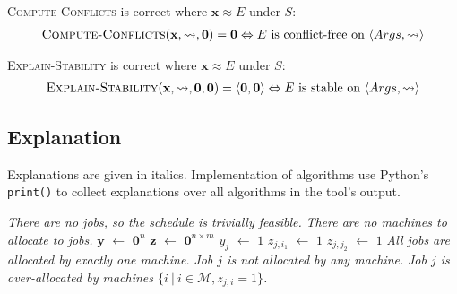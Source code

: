 \begin{proposition}
	\textsc{Compute-Conflicts} is correct where $\mathbf{x}\approx E$ under $S$:
	\begin{align*}
	\textsc{Compute-Conflicts}(\mathbf{x},\rightsquigarrow,\mathbf{0})=\mathbf{0}\Leftrightarrow E\text{ is conflict-free on }\langle Args, \rightsquigarrow\rangle
	\end{align*}
\end{proposition}

\begin{proposition}
	\textsc{Explain-Stability} is correct where $\mathbf{x}\approx E$ under $S$:
	\begin{align*}
		\textsc{Explain-Stability}(\mathbf{x},\rightsquigarrow,\mathbf{0},\mathbf{0})=\langle{\mathbf{0}},{\mathbf{0}}\rangle\Leftrightarrow E\text{ is stable on }\langle Args, \rightsquigarrow\rangle
	\end{align*}
\end{proposition}
	
\subsection{Explanation}

Explanations are given in italics. Implementation of algorithms use Python's \verb|print()| to collect explanations over all algorithms in the tool's output.

\begin{algorithm}[H]
	\caption{}
	\begin{algorithmic}[1]
					\State \emph{There are no jobs, so the schedule is trivially feasible.}
				\Else
					\State \emph{There are no machines to allocate to jobs.}
				\EndIf
			\Else
				\State $\mathbf{y}$ $\gets$ $\mathbf{0}^n$
				\State $\mathbf{z}$ $\gets$ $\mathbf{0}^{n\times m}$
								\State $y_j$ $\gets$ $1$
								\State $z_{j,i_1}$ $\gets$ $1$
								\State $z_{j,j_2}$ $\gets$ $1$
							\EndIf
						\EndFor
					\EndFor					
				\EndFor
					\State \emph{All jobs are allocated by exactly one machine.}
				\Else
							\State \emph{Job $j$ is not allocated by any machine.}
						\EndIf
							\State \emph{Job $j$ is over-allocated by machines $\{i\ |\ i\in\mathcal{M}, z_{j,i}=1\}$.}
						\EndIf
					\EndFor
				\EndIf
			\EndIf
		\EndFunction
	\end{algorithmic}
\end{algorithm}

